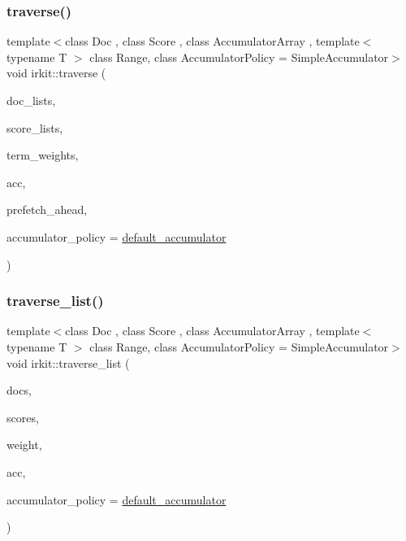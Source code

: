 \subsubsection{\texorpdfstring{traverse()}{traverse()}\hspace{0.1cm}{\footnotesize\ttfamily [2/2]}}
{\footnotesize\ttfamily template$<$class Doc , class Score , class Accumulator\+Array , template$<$ typename T $>$ class Range, class Accumulator\+Policy  = Simple\+Accumulator$>$ \\
void irkit\+::traverse (\begin{DoxyParamCaption}\item[{const std\+::vector$<$ Range$<$ Doc $>$$>$ \&}]{doc\+\_\+lists,  }\item[{const std\+::vector$<$ Range$<$ Score $>$$>$ \&}]{score\+\_\+lists,  }\item[{const std\+::vector$<$ Score $>$ \&}]{term\+\_\+weights,  }\item[{Accumulator\+Array \&}]{acc,  }\item[{unsigned int}]{prefetch\+\_\+ahead,  }\item[{Accumulator\+Policy \&}]{accumulator\+\_\+policy = {\ttfamily \hyperlink{namespaceirkit_a823671564bf545991e9708011e4a8df1}{default\+\_\+accumulator}} }\end{DoxyParamCaption})}

\mbox{\label{namespaceirkit_ac5cd7f5c083918572c6b91cd9822768d}} 
\subsubsection{\texorpdfstring{traverse\+\_\+list()}{traverse\_list()}\hspace{0.1cm}{\footnotesize\ttfamily [1/2]}}
{\footnotesize\ttfamily template$<$class Doc , class Score , class Accumulator\+Array , template$<$ typename T $>$ class Range, class Accumulator\+Policy  = Simple\+Accumulator$>$ \\
void irkit\+::traverse\+\_\+list (\begin{DoxyParamCaption}\item[{const Range$<$ Doc $>$ \&}]{docs,  }\item[{const Range$<$ Score $>$ \&}]{scores,  }\item[{Score}]{weight,  }\item[{Accumulator\+Array \&}]{acc,  }\item[{Accumulator\+Policy \&}]{accumulator\+\_\+policy = {\ttfamily \hyperlink{namespaceirkit_a823671564bf545991e9708011e4a8df1}{default\+\_\+accumulator}} }\end{DoxyParamCaption})}

